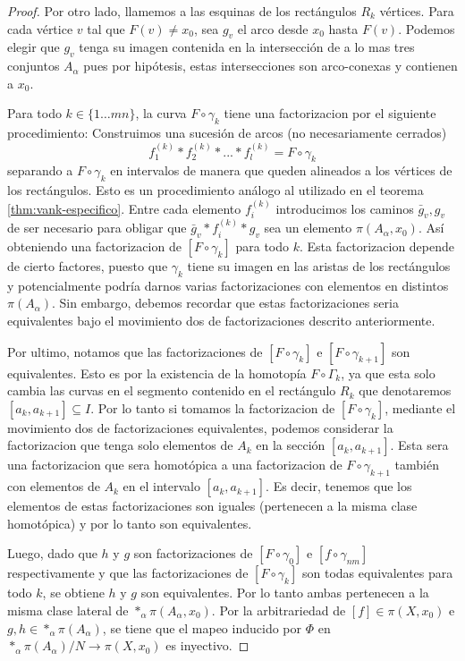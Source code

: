 \begin{proof}
  Por otro lado, llamemos a las esquinas de los rectángulos \(R_k\)
  vértices. Para cada vértice \(v\) tal que \(F (v) \neq x_0\), sea
  \(g_v\) el arco desde \(x_0\) hasta \(F(v)\). Podemos elegir que
  \(g_v\) tenga su imagen contenida en la intersección de a lo mas tres
  conjuntos \(A_\alpha\) pues por hipótesis, estas intersecciones son
  arco-conexas y contienen a \(x_0\).

  Para todo \(k \in \{1 \dots mn\}\), la curva \(F \circ \gamma_k\)
  tiene una factorizacion por el siguiente procedimiento: Construimos
  una sucesión de arcos (no necesariamente cerrados)
  \[ f_1^{(k)} * f_2^{(k)} * ... * f_l^{(k)} = F \circ \gamma_k \]
  separando a \(F \circ \gamma_k\) en intervalos de manera que queden
  alineados a los vértices de los rectángulos. Esto es un
  procedimiento análogo al utilizado en el teorema
  \ref{thm:vank-especifico}. Entre cada elemento \(f_i^{(k)}\)
  introducimos los caminos \(\bar g _v , g_v\) de ser necesario para
  obligar que \(\bar g _v * f_i^{(k)} * g_v \) sea un elemento \(\pi
  (A_\alpha, x_0)\). Así obteniendo una factorizacion de \([F \circ
  \gamma_k]\) para todo \(k\). Esta factorizacion depende de cierto
  factores, puesto que \(\gamma_k\) tiene su imagen en las aristas de
  los rectángulos y potencialmente podría darnos varias factorizaciones
  con elementos en distintos \(\pi (A_\alpha)\). Sin embargo, debemos
  recordar que estas factorizaciones seria equivalentes bajo el
  movimiento dos de factorizaciones descrito anteriormente.

  Por ultimo, notamos que las factorizaciones de \([F \circ \gamma_k]\) e
  \([F \circ \gamma_{k+1}]\) son equivalentes. Esto es por la existencia
  de la homotopía \(F \circ \Gamma_k\), ya que esta solo cambia las curvas en
  el segmento contenido en el rectángulo \(R_k\) que denotaremos \([a_k,
  a_{k+1}] \subseteq I\). Por lo tanto si
  tomamos la factorizacion de \([F \circ \gamma_{k}]\), mediante el
  movimiento dos de factorizaciones equivalentes, podemos considerar la
  factorizacion que tenga solo elementos de \(A_k\) en la sección \([a_k,
  a_{k+1}]\). Esta sera una factorizacion que sera homotópica a una
  factorizacion de \(F \circ \gamma_{k+1}\) también con elementos de
  \(A_k\) en el intervalo \([a_k , a_{k+1}]\). Es decir, tenemos que los
  elementos de estas factorizaciones son iguales (pertenecen a la misma
  clase homotópica) y por lo tanto son equivalentes.


  Luego, dado que \(h\) y \(g\) son factorizaciones de \([F \circ
  \gamma_0]\) e \([f \circ \gamma_{nm}]\) respectivamente y que las
  factorizaciones de \([F \circ \gamma_k]\) son todas equivalentes para
  todo \(k\), se obtiene \(h\) y \(g\) son equivalentes. Por lo tanto
  ambas pertenecen a la misma clase lateral de \(*_\alpha \pi (A_\alpha ,
  x_0)\). Por la arbitrariedad de \([f] \in \pi (X, x_0)\) e \(g,h \in
  *_\alpha \pi (A_\alpha)\), se tiene que el mapeo inducido por \(\Phi\)
  en \(*_\alpha \pi (A_\alpha) / N \to \pi (X,x_0)\) es inyectivo.
\end{proof}
